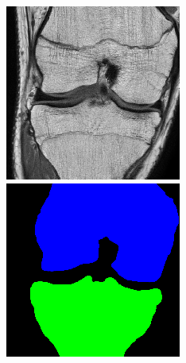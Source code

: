 \begin{figure}[H]
  \includegraphics[width=\linewidth]{imgs/a1.png}
\endminipage\hfill
{}
  \includegraphics[width=\linewidth]{imgs/b1.png}

\end{figure}
